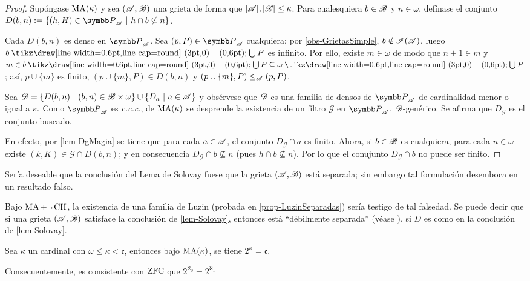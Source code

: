 \begin{proof}
	Supóngase $\operatorname{MA}(\kappa)$ y sea $(\mathscr{A},\mathscr{B})$ una grieta de forma que $|\mathscr{A}|,|\mathscr{B}|\leq \kappa$. Para cualesquiera $b \in \mathscr{B}$ y $n \in \omega$, defínase el conjunto $D(b,n):=\{ (h,H) \in \mathbb{P}_\ms{A} \tq h \cap b \not\subseteq n \}$.

	Cada $D(b,n)$ es denso en $\mathbb{P}_\ms{A}$. Sea $(p,P) \in \mathbb{P}_\ms{A}$ cualquiera; por \ref{obs-GrietasSimple}, $b \notin \mathscr{I}(\mathscr{A}) $, luego $b \setminus \midcup P$ es infinito. Por ello, existe $m \in \omega$ de modo que $n+1 \in m$ y $m \in b \setminus \midcup P \subseteq \omega \setminus \midcup P$; así, $p \cup \{m\}$ es finito, $(p \cup \{m\}, P) \in D(b,n)$ y $(p \cup \{m\}, P) \leq_{\mathscr{A}} (p,P)$.

	Sea $\mathscr{D}=\{ D(b,n) \text{ $|$ } (b,n) \in \mathscr{B} \times \omega \} \cup \{D_a \text{ $|$ } a \in \mathscr{A} \}$ y obsérvese que $\mathscr{D}$ es una familia de densos de $\mathbb{P}_\ms{A}$ de cardinalidad menor o igual a $\kappa$. Como $\mathbb{P}_\ms{A}$ es \textit{c.c.c.}, de $\operatorname{MA}(\kappa)$ se desprende la existencia de un filtro $\mathcal{G}$ en $\mathbb{P}_\ms{A}$, $\mathscr{D}$-genérico. Se afirma que $D_\mathcal{G}$ es el conjunto buscado.

	En efecto, por \ref{lem-DgMagia} se tiene que para cada $a \in \mathscr{A}$, el conjunto $D_\mathcal{G} \cap a$ es finito. Ahora, si $b \in \mathscr{B}$ es cualquiera, para cada $n \in \omega$ existe $(k,K) \in \mathcal{G} \cap D(b,n)$; y en consecuencia $D_\mathcal{G} \cap b \not \subseteq n$ (pues $h \cap b \not \subseteq n$). Por lo que el conujunto $D_\mathcal{G} \cap b$ no puede ser finito.
\end{proof}

Sería deseable que la conclusión del Lema de Solovay fuese que la grieta $(\mathscr{A},\mathscr{B})$ está separada; sin embargo tal formulación desemboca en un resultado falso.

Bajo $\operatorname{MA} + \lnot\operatorname{CH}$, la existencia de una familia de Luzin (probada en \ref{prop-LuzinSeparadas}) sería testigo de tal falsedad. Se puede decir que si una grieta $(\mathscr{A},\mathscr{B})$ satisface la conclusión de \ref{lem-Solovay}, entonces está ``débilmente separada'' (véase \cite[\S~ 3.2]{hruAlmost}), si $D$ es como en la conclusión de \ref{lem-Solovay}.


\begin{corolario}
	Sea $\kappa$ un cardinal con $\omega \leq \kappa <\mathfrak{c}$, entonces bajo $\operatorname{MA}(\kappa)$, se tiene $2^\kappa=\mathfrak{c}$.

	Consecuentemente, es consistente con $\operatorname{ZFC}$ que $2^{\aleph_0}=2^{\aleph_1}$
\end{corolario}


